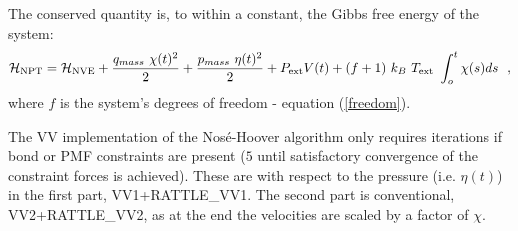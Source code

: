 The conserved quantity is, to within a constant, the Gibbs free energy
of the system:
\begin{equation}
{\cal H}_{\rm NPT} = {\cal H}_{\rm NVE} + {q_{mass}~\chi (t)^{2} \over 2} +
{p_{mass}~\eta (t)^{2} \over 2} + P_{\rm ext} V(t) +
(f+1)~k_{B}~T_{\rm ext}~\int_o^t \chi (s) ds~~,
\end{equation}
where $f$ is the system's degrees of freedom - equation
(\ref{freedom}).

The VV implementation of the Nos\'{e}-Hoover algorithm only requires iterations
if bond or PMF constraints are present ($5$ until satisfactory
convergence of the constraint forces is achieved).  These are
with respect to the pressure (i.e. $\eta (t)$) in the first part,
VV1+RATTLE\_VV1.  The second part is conventional, VV2+RATTLE\_VV2,
as at the end the velocities are scaled by a factor of $\chi$.
